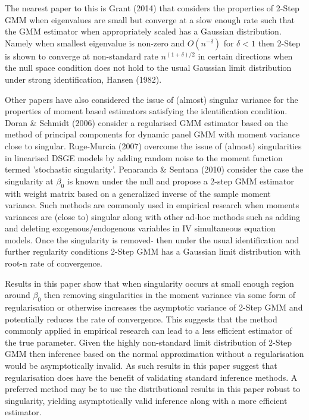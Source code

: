 \documentclass[11pt, fleqn]{article}
\begin{document}
The nearest paper to this is Grant (2014) that  considers the properties of 2-Step GMM when eigenvalues are small but converge at a slow enough rate such that the GMM estimator when appropriately  scaled has a Gaussian distribution. Namely when smallest eigenvalue is non-zero and $O(n^{-\delta})$ for $\delta<1$ then 2-Step is shown to converge  at non-standard rate $n^{(1+\delta)/2}$ in certain directions when the null space condition does not hold to the usual Gaussian limit distribution under strong identification, Hansen (1982).


Other papers have also considered the issue of (almost) singular variance for the properties of moment based estimators satisfying the identification condition.   Doran \& Schmidt  (2006) consider a regularised GMM estimator  based on the method of principal components for dynamic panel GMM with moment variance close to singular. Ruge-Murcia (2007) overcome the issue of (almost) singularities in linearised DSGE models by adding random noise to the moment function termed 'stochastic singularity'. Penaranda \& Sentana (2010) consider the case the singularity at $\beta_0$ is known under the null and propose a 2-step GMM estimator with weight matrix based on a generalized inverse of the sample moment variance. Such methods are commonly used in empirical research when moments variances are (close to) singular along with other ad-hoc methods such as adding and deleting exogenous/endogenous variables in IV simultaneous equation models. Once the singularity is removed- then under the usual identification and further regularity conditions 2-Step GMM has a Gaussian limit distribution with root-n rate of convergence. 


Results in this paper show that when singularity occurs at small enough region around $\beta_0$ then removing singularities in the moment variance via some form of regularisation or otherwise increases the asymptotic variance of 2-Step GMM and potentially reduces the rate of convergence.  This suggests that the method commonly applied in empirical research can lead to a less efficient estimator of the true parameter. Given the highly non-standard limit distribution of 2-Step GMM  then inference based on the normal approximation without  a regularisation would be  asymptotically invalid. As such results in this paper suggest that regularisation does have the benefit of validating standard inference methods. A preferred method may be to use the distributional results in this paper robust to singularity, yielding asymptotically valid inference along with a more efficient estimator.
\end{document}
